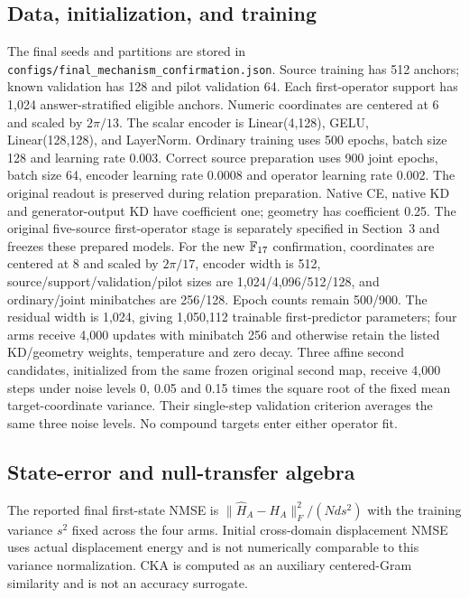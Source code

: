 \subsection{Data, initialization, and training}
The final seeds and partitions are stored in \texttt{configs/final\_mechanism\_confirmation.json}.
Source training has 512 anchors; known validation has 128 and pilot validation 64. Each first-operator support has 1,024 answer-stratified eligible anchors.
Numeric coordinates are centered at 6 and scaled by $2\pi/13$. The scalar encoder is Linear(4,128), GELU, Linear(128,128), and LayerNorm.
Ordinary training uses 500 epochs, batch size 128 and learning rate 0.003. Correct source preparation uses 900 joint epochs, batch size 64, encoder learning rate 0.0008 and operator learning rate 0.002.
The original readout is preserved during relation preparation. Native CE, native KD and generator-output KD have coefficient one; geometry has coefficient 0.25.
The original five-source first-operator stage is separately specified in Section~3 and freezes these prepared models. For the new $\mathbb{F}_{17}$ confirmation, coordinates are centered at 8 and scaled by $2\pi/17$, encoder width is 512, source/support/validation/pilot sizes are 1,024/4,096/512/128, and ordinary/joint minibatches are 256/128. Epoch counts remain 500/900. The residual width is 1,024, giving 1,050,112 trainable first-predictor parameters; four arms receive 4,000 updates with minibatch 256 and otherwise retain the listed KD/geometry weights, temperature and zero decay. Three affine second candidates, initialized from the same frozen original second map, receive 4,000 steps under noise levels 0, 0.05 and 0.15 times the square root of the fixed mean target-coordinate variance. Their single-step validation criterion averages the same three noise levels. No compound targets enter either operator fit.

\subsection{State-error and null-transfer algebra}
The reported final first-state NMSE is
$\|\hat H_A-H_A\|_F^2/(Nds^2)$ with the training variance $s^2$ fixed across the four arms.
Initial cross-domain displacement NMSE uses actual displacement energy and is not numerically comparable to this variance normalization.
CKA is computed as an auxiliary centered-Gram similarity and is not an accuracy surrogate.

